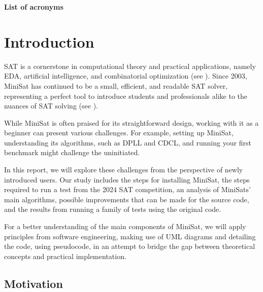 \documentclass[runningheads]{llncs}
\begin{document}
\newpage
\tableofcontents
\listoftables
{\noindent \large \textbf{List of acronyms}\par}

\begin{acronym}
\end{acronym}
\newpage

\section{Introduction}\label{cap:intro}

\ac{SAT} is a cornerstone in computational theory and practical applications, namely \ac{EDA}, artificial intelligence, and combinatorial optimization (see \cite{sat-solver}). Since 2003, MiniSat has continued to be a small, efficient, and readable \ac{SAT} solver, representing a perfect tool to introduce students and professionals alike to the nuances of \ac{SAT} solving (see \cite{minisat}).

While MiniSat is often praised for its straightforward design, working with it as a beginner can present various challenges. For example, setting up MiniSat, understanding its algorithms, such as \ac{DPLL} and \ac{CDCL}, and running your first benchmark might challenge the uninitiated.

In this report, we will explore these challenges from the perspective of newly introduced users. Our study includes the steps for installing MiniSat, the steps required to run a test from the 2024 \ac{SAT} competition, an analysis of MiniSats' main algorithms, possible improvements that can be made for the source code, and the results from running a family of tests using the original code. 

For a better understanding of the main components of MiniSat, we will apply principles from software engineering, making use of \ac{UML} diagrams and detailing the code, using pseudocode, in an attempt to bridge the gap between theoretical concepts and practical implementation.

\subsection{Motivation}\label{sect:Motivation}
\end{document}
